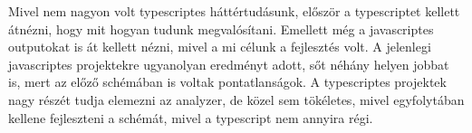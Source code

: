 \noindent

Mivel nem nagyon volt typescriptes háttértudásunk, először a typescriptet kellett átnézni, hogy mit hogyan tudunk megvalósítani.
Emellett még a javascriptes outputokat is át kellett nézni, mivel a mi célunk a fejlesztés volt. A jelenlegi javascriptes projektekre ugyanolyan eredményt adott, sőt néhány helyen jobbat is, mert az előző schémában is voltak pontatlanságok.
A typescriptes projektek nagy részét tudja elemezni az analyzer, de közel sem tökéletes, mivel egyfolytában kellene fejleszteni a schémát, mivel a typescript nem annyira régi.
